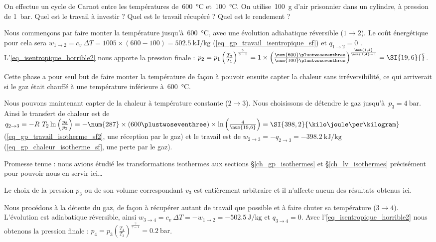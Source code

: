 		\begin{anexample}
		\label{ex_cycle_carnot}
			On effectue un cycle de Carnot entre les températures de~\SI{600}{\degreeCelsius} et~\SI{100}{\degreeCelsius}. On utilise~\SI{100}{\gram} d’air prisonnier dans un cylindre, à pression de \SI{1}{\bar}. Quel est le travail à investir ? Quel est le travail récupéré ? Quel est le rendement ?
				 \begin{answer}
				 	Nous commençons par faire monter la température jusqu’à~\SI{600}{\degreeCelsius}, avec une évolution adiabatique réversible ($1\to 2$). Le coût énergétique pour cela sera $w_{1\to 2} = c_v \ \Delta T = \num{1005}\times(\num{600}-\num{100}) = \SI{+502,5}{\kilo\joule\per\kilogram}$ (\ref{eq_gp_travail_isentropique_sf}) et $q_{1\to 2} = 0$ . L’\cref{eq_isentropique_horrible2} nous apporte la pression finale : $p_2 
				 	= p_1 \left(\frac{T_2}{T_1}\right)^{\frac{\gamma}{\gamma - 1}} 
				 	= 1 \times \left(\frac{\num{600}\plustwoseventhree}{\num{100}\plustwoseventhree}\right)^{\frac{\num{1,4}}{\num{1,4} - 1}}
				 	= \SI{19,6}{\bar}$.
				 		\begin{remark}Cette phase a pour seul but de faire monter la température de façon à pouvoir ensuite capter la chaleur sans irréversibilité, ce qui arriverait si le gaz était chauffé à une température inférieure à~\SI{600}{\degreeCelsius}.\end{remark}
					Nous pouvons maintenant capter de la chaleur à température constante ($2 \to 3$). Nous choisissons de détendre le gaz jusqu’à~$p_3 = \SI{4}{\bar}$. Ainsi le transfert de chaleur est de $q_{2 \to 3} 
					= - R \ T_2 \ln\left(\frac{p_3}{p_2}\right)
					= - \num{287} \times (600\plustwoseventhree) \times \ln \left(\frac{4}{\num{19,6}}\right)
					= \SI{398,2}{\kilo\joule\per\kilogram}$ (\ref{eq_gp_travail_isotherme_sf2}, une réception par le gaz) et le travail est de $w_{2 \to 3} = - q_{2 \to 3} = \SI{-398,2}{\kilo\joule\per\kilogram}$ (\ref{eq_gp_chaleur_isotherme_sf}, une perte par le gaz).
						\begin{remark}Promesse tenue : nous avions étudié les transformations isothermes aux sections \S\ref{ch_gp_isothermes} et \S\ref{ch_lv_isothermes} précisément pour pouvoir nous en servir ici…\end{remark}
				 		\begin{remark}Le choix de la pression $p_3$ ou de son volume correspondant $v_3$ est entièrement arbitraire et il n’affecte aucun des résultats obtenus ici.\end{remark}
				 	Nous procédons à la détente du gaz, de façon à récupérer autant de travail que possible et à faire chuter sa température ($3 \to 4$). L’évolution est adiabatique réversible, ainsi $w_{3\to 4} = c_v \ \Delta T = -w_{1\to 2} = \SI{-502,5}{\joule\per\kilogram}$ et $q_{3\to 4} = 0$. Avec l’\cref{eq_isentropique_horrible2} nous obtenons la pression finale : $p_4 = p_3 \left(\frac{T_4}{T_3}\right)^{\frac{\gamma}{\gamma - 1}} = \SI{0,2}{\bar}$.

\end{answer}
\end{anexample}
